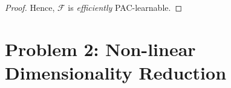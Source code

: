 \documentclass[twoside,11pt]{homework}
\DeclarePairedDelimiter{\2norm}{\lVert}{\rVert^2_2}
\newcommand{\1}[1]{\mathds{1}\left[#1\right]}
\begin{document}
\begin{proof}
\noindent
Hence, $\mathcal{F}$ is \textit{efficiently} PAC-learnable.

\end{proof}




\section*{Problem 2: Non-linear Dimensionality Reduction}
\end{document}
